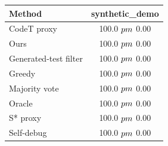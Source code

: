 \begin{tabular}{lc}
\toprule
Method & synthetic_demo \\
\midrule
CodeT proxy & 100.0 $\\pm$ 0.00 \\
Ours & 100.0 $\\pm$ 0.00 \\
Generated-test filter & 100.0 $\\pm$ 0.00 \\
Greedy & 100.0 $\\pm$ 0.00 \\
Majority vote & 100.0 $\\pm$ 0.00 \\
Oracle & 100.0 $\\pm$ 0.00 \\
S* proxy & 100.0 $\\pm$ 0.00 \\
Self-debug & 100.0 $\\pm$ 0.00 \\
\bottomrule
\end{tabular}
